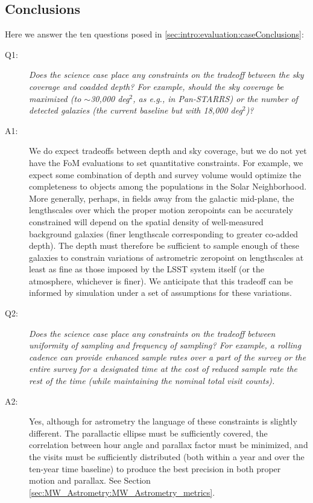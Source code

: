 
\subsection{Conclusions}

Here we answer the ten questions posed in
\autoref{sec:intro:evaluation:caseConclusions}:

\begin{description}

\item[Q1:] {\it Does the science case place any constraints on the
tradeoff between the sky coverage and coadded depth? For example, should
the sky coverage be maximized (to $\sim$30,000 deg$^2$, as e.g., in
Pan-STARRS) or the number of detected galaxies (the current baseline but
with 18,000 deg$^2$)?}

\item[A1:] We do expect tradeoffs between depth and sky
  coverage, but we do not yet have the FoM evaluations to set
  quantitative constraints. For example, we expect some combination of
  depth and survey volume would optimize the completeness to objects
  among the populations in the Solar Neighborhood. More generally,
  perhaps, in fields away from the galactic mid-plane, the
  lengthscales over which the proper motion zeropoints can be
  accurately constrained will depend on the spatial density of
  well-measured background galaxies (finer lengthscale corresponding
  to greater co-added depth). The depth must therefore be sufficient
  to sample enough of these galaxies to constrain variations of
  astrometric zeropoint on lengthscales at least as fine as those
  imposed by the LSST system itself (or the atmosphere, whichever is
  finer). We anticipate that this tradeoff can be informed by
  simulation under a set of assumptions for these variations.

\item[Q2:] {\it Does the science case place any constraints on the
tradeoff between uniformity of sampling and frequency of  sampling? For
example, a rolling cadence can provide enhanced sample rates over a part
of the survey or the entire survey for a designated time at the cost of
reduced sample rate the rest of the time (while maintaining the nominal
total visit counts).}

\item[A2:] Yes, although for astrometry the language of these
  constraints is slightly different. The parallactic ellipse must be
  sufficiently covered, the correlation between hour angle and
  parallax factor must be minimized, and the visits must be
  sufficiently distributed (both within a year and over the ten-year
  time baseline) to produce the best precision in both proper motion and parallax. See Section \ref{sec:MW_Astrometry:MW_Astrometry_metrics}.


\end{description}
